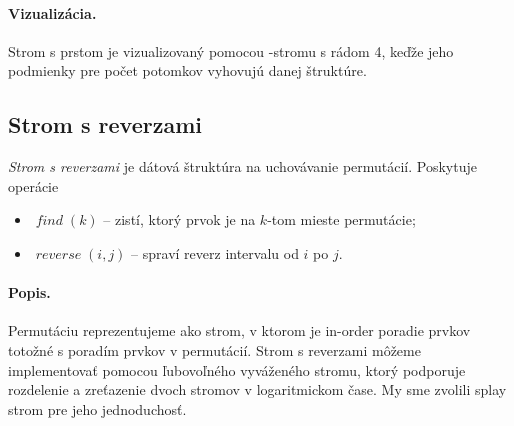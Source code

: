
\paragraph{Vizualizácia.}
Strom s prstom je vizualizovaný pomocou \Bp-stromu s rádom 4, keďže jeho podmienky pre počet potomkov vyhovujú
danej štruktúre.
\def\find{$\mathop{find}(k)$}

\subsection{Strom s reverzami}
\emph{Strom s reverzami} je dátová štruktúra na uchovávanie permutácií. 
Poskytuje operácie 
\begin{itemize}
\item $\mathop{\mathit{find}}(k)$ -- zistí, ktorý prvok je na $k$-tom mieste permutácie;
\item $\mathop{\mathit{reverse}}(i,j)$ -- spraví reverz intervalu od $i$ po $j$.
\end{itemize}

\paragraph{Popis.}
Permutáciu reprezentujeme ako strom, v ktorom je in-order poradie prvkov totožné 
s poradím prvkov v permutácií. Strom s reverzami môžeme implementovať pomocou ľubovoľného 
vyváženého stromu, ktorý podporuje rozdelenie a zreťazenie dvoch stromov v logaritmickom čase. 
My sme zvolili splay strom pre jeho jednoduchosť. 

